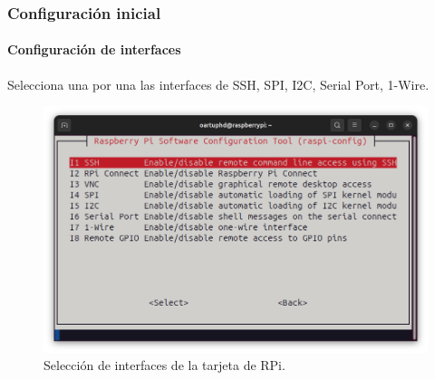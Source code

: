 \documentclass{beamer}
\begin{document}
		\begin{frame}
		\frametitle{Configuración inicial}
		\framesubtitle{Configuración de interfaces}
		Selecciona una por una las interfaces de SSH, SPI, I2C, Serial Port, 1-Wire.
		\begin{figure}
			\includegraphics[scale=0.25]{configrpi2.png}
			\caption{Selección de interfaces de la tarjeta de RPi. }
		\end{figure}
		
	\end{frame}
\end{document}
